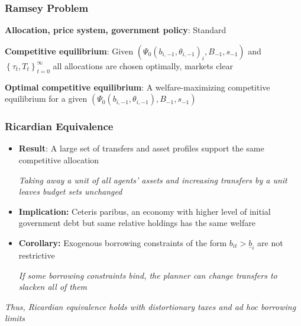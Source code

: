 \documentclass{beamer}
\begin{document}
\begin{frame}
 \frametitle{Ramsey Problem}
\label{ramsey-problem}
\begin{definition}
\textbf{Allocation, price system, government policy}: Standard

\end{definition}

\begin{definition}
\textbf{Competitive equilibrium}: Given $\left( \Psi_0(b_{i,-1},\theta_{i,-1})
_{i},B_{-1},s_{-1}\right) $ and $\left\{ \tau _{t},T_{t}\right\} _{t=0}^{\infty }$
all allocations are chosen optimally, markets clear 
\end{definition}

\begin{definition}
\textbf{Optimal competitive equilibrium}: A welfare-maximizing competitive
equilibrium for a given $\left( \Psi_0(b_{i,-1},\theta_{i,-1}),B_{-1},s_{-1}\right) $
\end{definition}
\hyperlink{extra-slides}{}
 \end{frame}




 \begin{frame}
  \frametitle{Ricardian Equivalence}
  \begin{itemize}
   \item \textbf{Result}: A large set of transfers and asset profiles support the same competitive allocation
   
   \emph{Taking away a unit of all agents' assets and increasing transfers by a unit leaves budget sets unchanged}
   
   \vspace{2mm}
   
   \item \textbf{Implication:} Ceteris paribus, an economy with higher level of initial government debt  but same relative holdings has the same welfare
   
   \vspace{2mm}
   
   \item \textbf{Corollary:} Exogenous borrowing constraints of the form $b_{it}>\underline{b}_i$ are not restrictive
\vspace{2mm}
   
   
 \emph {If some borrowing constraints bind, the planner can change transfers to  slacken   \emph{all}  of them}
  \end{itemize}
  \color{red}\emph{Thus, Ricardian equivalence holds with distortionary taxes and ad hoc borrowing limits}

  
  
\end{frame}
\end{document}
